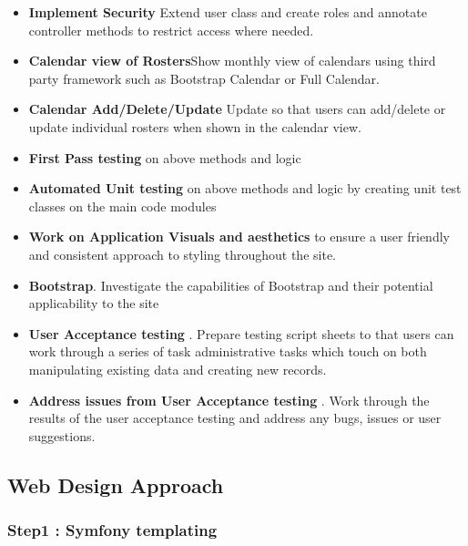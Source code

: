 \documentclass[a4paper,12pt]{article}
\begin{document}
\begin {itemize}
\item  \textbf{Implement Security} Extend user class and create roles and annotate controller methods to restrict access where needed.
\item  \textbf{Calendar view of Rosters}Show monthly view of calendars using third party framework such as Bootstrap Calendar or Full Calendar.
\item  \textbf{Calendar Add/Delete/Update }Update so that users can add/delete or update individual rosters when shown in the calendar view.
\item  \textbf{First Pass testing} on above methods and logic
\item  \textbf{Automated Unit testing} on above methods and logic by creating unit test classes on the main code modules
\item  \textbf{Work on Application Visuals and aesthetics} to ensure a user friendly and consistent approach to styling throughout the site.
\item  \textbf{Bootstrap}. Investigate the capabilities of Bootstrap and their potential applicability to the site
\item  \textbf{User Acceptance testing }. Prepare testing script sheets to that users can work through a series of task administrative tasks which touch on both manipulating existing data and creating new records.
\item  \textbf{Address issues from User Acceptance testing }. Work through the results of the user acceptance testing and address any bugs, issues or user suggestions.
\end {itemize}

\subsection {Web Design Approach}

\subsubsection {Step1 : Symfony templating}
\end{document}
